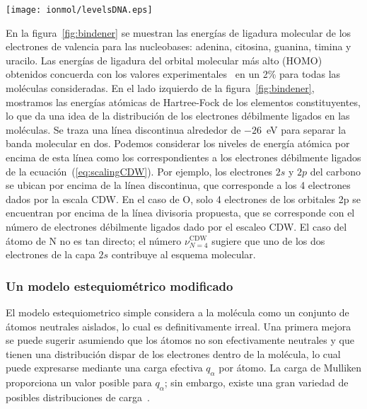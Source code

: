 \begin{figure*}[t]
\centering
\texttt{[image: ionmol/levelsDNA.eps]}
\caption[Energías de ligadura moleculares teóricas de ADN y ARN.]
{Energías de ligadura moleculares teóricas de adenina, citosina, guanina, 
timina, y uracilo, comparado con los valores correspondientes de los 
átomos que las constituyen.}
\label{fig:bindener}
\end{figure*}

En la figura~\ref{fig:bindener} se muestran las energías de ligadura 
molecular de los electrones de valencia para las nucleobases: adenina, 
citosina, guanina, timina y uracilo. Las energías de ligadura del orbital 
molecular más alto (HOMO) obtenidos concuerda con los valores
experimentales~\cite{Hush,Verkin,Dougherty} en un 2\% para todas las 
moléculas consideradas. En el lado izquierdo de la figura~\ref{fig:bindener}, 
mostramos las energías atómicas de Hartree-Fock de los elementos 
constituyentes, lo que da una idea de la distribución de los electrones
débilmente ligados en las moléculas. Se traza una línea discontinua 
alrededor de $-26$~eV para separar la banda molecular en dos. Podemos 
considerar los niveles de energía atómica por encima de esta línea como 
los correspondientes a los electrones débilmente ligados de la 
ecuación~(\ref{eq:scalingCDW}). Por ejemplo, los electrones $2s$ y $2p$ 
del carbono se ubican por encima de la línea discontinua, que corresponde 
a los 4 electrones dados por la escala CDW. En el caso de O, solo 4 
electrones de los orbitales 2p se encuentran por encima de la línea 
divisoria propuesta, que se corresponde con el número de electrones
débilmente ligados dado por el escaleo CDW. El caso del átomo de N no 
es tan directo; el número $\nu_{N=4}^{\text{CDW}}$ sugiere que uno de 
los dos electrones de la capa $2s$ contribuye al esquema molecular.

\subsubsection{Un modelo estequiométrico modificado}

El modelo estequiometrico simple considera a la molécula como un 
conjunto de átomos neutrales aislados, lo cual es definitivamente irreal.
Una primera mejora se puede sugerir asumiendo que los átomos no son
efectivamente neutrales y que tienen una distribución dispar de los 
electrones dentro de la molécula, lo cual puede expresarse mediante una
carga efectiva $q_{\alpha}$ por átomo. La carga de Mulliken proporciona
un valor posible para $q_{\alpha}$; sin embargo, existe una gran variedad
de posibles distribuciones de carga~\cite{lee2003}.

